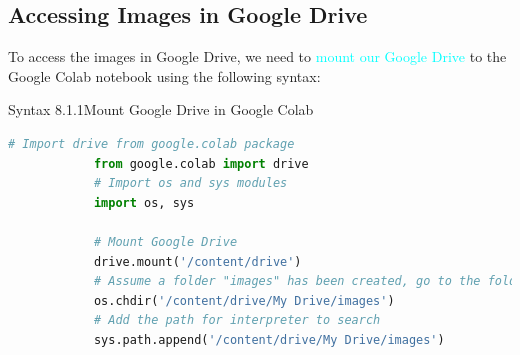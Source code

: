 \documentclass{book}
\begin{document}
\subsection{Accessing Images in Google Drive}
To access the images in Google Drive, we need to \textcolor{cyan}{mount our Google Drive} to the Google Colab notebook using the following syntax:
\begin{synBox}{Syntax 8.1.1}{Mount Google Drive in Google Colab}
    \begin{lstlisting}[language=Python, basicstyle=\ttfamily\small, keywordstyle=\color{blue}, commentstyle=\color{forestgreen}, stringstyle=\color{red}, showstringspaces=false]
            # Import drive from google.colab package
            from google.colab import drive
            # Import os and sys modules
            import os, sys

            # Mount Google Drive
            drive.mount('/content/drive')
            # Assume a folder "images" has been created, go to the folder "images"
            os.chdir('/content/drive/My Drive/images')
            # Add the path for interpreter to search
            sys.path.append('/content/drive/My Drive/images')
    \end{lstlisting}
\end{synBox}
\end{document}
